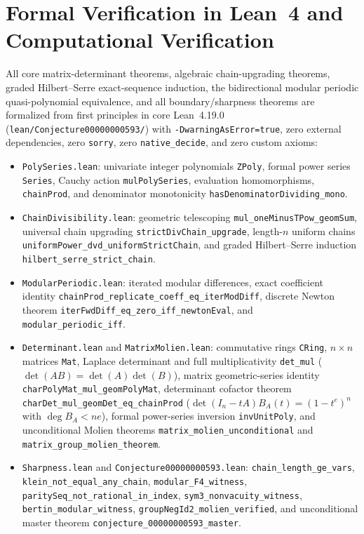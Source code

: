 \documentclass[11pt]{article}
\theoremstyle{definition}
\theoremstyle{remark}
\begin{document}
\section{Formal Verification in Lean~4 and Computational Verification}

All core matrix-determinant theorems, algebraic chain-upgrading theorems, graded Hilbert--Serre exact-sequence induction, the bidirectional modular periodic quasi-polynomial equivalence, and all boundary/sharpness theorems are formalized from first principles in core Lean~4.19.0 (\texttt{lean/Conjecture00000000593/}) with \texttt{-DwarningAsError=true}, zero external dependencies, zero \texttt{sorry}, zero \texttt{native\_decide}, and zero custom axioms:
\begin{itemize}\raggedright
\item \texttt{PolySeries.lean}: univariate integer polynomials \texttt{ZPoly}, formal power series \texttt{Series}, Cauchy action \texttt{mulPolySeries}, evaluation homomorphisms, \texttt{chainProd}, and denominator monotonicity \texttt{hasDenominatorDividing\_mono}.
\item \texttt{ChainDivisibility.lean}: geometric telescoping \texttt{mul\_oneMinusTPow\_geomSum}, universal chain upgrading \texttt{strictDivChain\_upgrade}, length-$n$ uniform chains \texttt{uniformPower\_dvd\_uniformStrictChain}, and graded Hilbert--Serre induction \texttt{hilbert\_serre\_strict\_chain}.
\item \texttt{ModularPeriodic.lean}: iterated modular differences, exact coefficient identity \texttt{chainProd\_replicate\_coeff\_eq\_iterModDiff}, discrete Newton theorem \texttt{iterFwdDiff\_eq\_zero\_iff\_newtonEval}, and \texttt{modular\_periodic\_iff}.
\item \texttt{Determinant.lean} and \texttt{MatrixMolien.lean}: commutative rings \texttt{CRing}, $n \times n$ matrices \texttt{Mat}, Laplace determinant and full multiplicativity \texttt{det\_mul} ($\det(AB) = \det(A)\det(B)$), matrix geometric-series identity \texttt{charPolyMat\_mul\_geomPolyMat}, determinant cofactor theorem \texttt{charDet\_mul\_geomDet\_eq\_chainProd} ($\det(I_n - tA) B_A(t) = (1 - t^e)^n$ with $\deg B_A < ne$), formal power-series inversion \texttt{invUnitPoly}, and unconditional Molien theorems \texttt{matrix\_molien\_unconditional} and \texttt{matrix\_group\_molien\_theorem}.
\item \texttt{Sharpness.lean} and \texttt{Conjecture00000000593.lean}: \texttt{chain\_length\_ge\_vars}, \texttt{klein\_not\_equal\_any\_chain}, \texttt{modular\_F4\_witness}, \texttt{paritySeq\_not\_rational\_in\_index}, \texttt{sym3\_nonvacuity\_witness}, \texttt{bertin\_modular\_witness}, \texttt{groupNegId2\_molien\_verified}, and unconditional master theorem \texttt{conjecture\_00000000593\_master}.
\end{itemize}
\end{document}
